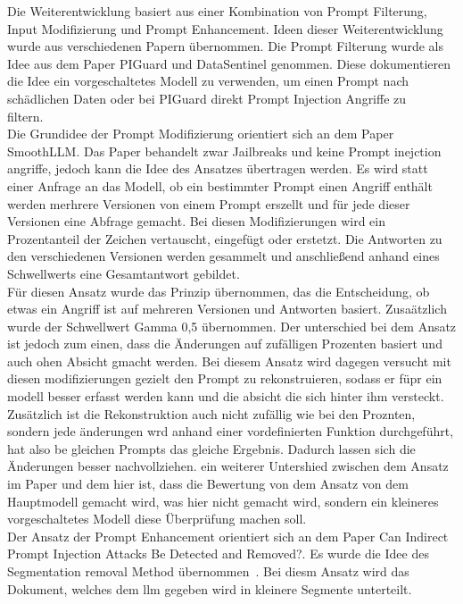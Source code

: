 Die Weiterentwicklung basiert aus einer Kombination von Prompt Filterung, Input Modifizierung und Prompt Enhancement. Ideen dieser Weiterentwicklung
wurde aus verschiedenen Papern übernommen. Die Prompt Filterung wurde als Idee aus dem Paper PIGuard und DataSentinel genommen. Diese dokumentieren die Idee
ein vorgeschaltetes Modell zu verwenden, um einen Prompt nach schädlichen Daten oder bei PIGuard direkt Prompt Injection Angriffe zu filtern.~\cite[30426]{sm37}~\cite[2194]{sm39} \\
Die Grundidee der Prompt Modifizierung orientiert sich an dem Paper SmoothLLM. Das Paper behandelt zwar Jailbreaks und keine Prompt inejction angriffe, jedoch
kann die Idee des Ansatzes übertragen werden.
Es wird statt einer Anfrage an das Modell, ob ein bestimmter Prompt einen Angriff enthält werden merhrere Versionen von einem Prompt erszellt und
für jede dieser Versionen eine Abfrage gemacht. Bei diesen Modifizierungen wird ein Prozentanteil der Zeichen vertauscht, eingefügt oder erstetzt. Die Antworten 
zu den verschiedenen Versionen werden gesammelt und anschließend anhand eines Schwellwerts eine Gesamtantwort gebildet. \\
Für diesen Ansatz wurde das Prinzip übernommen, das die Entscheidung, ob etwas ein Angriff ist auf mehreren Versionen und Antworten basiert. Zusaätzlich wurde
der Schwellwert Gamma 0,5 übernommen. Der unterschied bei dem Ansatz ist jedoch zum einen, dass die Änderungen auf zufälligen Prozenten basiert und auch ohen 
Absicht gmacht werden. Bei diesem Ansatz wird dagegen versucht mit diesen modifizierungen gezielt den Prompt zu rekonstruieren, sodass er füpr ein modell 
besser erfasst werden kann und die absicht die sich hinter ihm versteckt. Zusätzlich ist die Rekonstruktion auch nicht zufällig wie bei den Proznten, sondern 
jede änderungen wrd anhand einer vordefinierten Funktion durchgeführt, hat also be gleichen Prompts das gleiche Ergebnis. Dadurch lassen sich die Änderungen besser
nachvollziehen. ein weiterer Untershied zwischen dem Ansatz im Paper und dem hier ist, dass die Bewertung von dem Ansatz von dem Hauptmodell gemacht wird, was hier
nicht gemacht wird, sondern ein kleineres vorgeschaltetes Modell diese Überprüfung machen soll.~\cite{sm40} \\
Der Ansatz der Prompt Enhancement orientiert sich an dem Paper Can Indirect Prompt Injection Attacks Be Detected and Removed?. Es wurde die Idee des 
Segmentation removal Method übernommen~\cite[18193]{sm41}. Bei diesm Ansatz wird das Dokument, welches dem \ac{llm} gegeben wird in kleinere Segmente unterteilt. 
